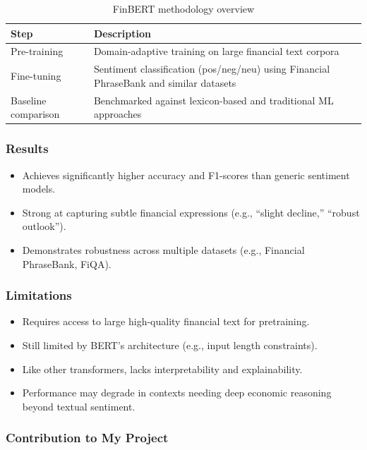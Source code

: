 \documentclass[12pt,a4paper]{report}
\begin{document}
\begin{table}[h]
\centering
\caption{FinBERT methodology overview}
\begin{tabular}{|p{3.5cm}|p{9cm}|}
\hline
\textbf{Step} & \textbf{Description} \\
\hline
Pre-training & Domain-adaptive training on large financial text corpora \\
\hline
Fine-tuning & Sentiment classification (pos/neg/neu) using Financial PhraseBank and similar datasets \\
\hline
Baseline comparison & Benchmarked against lexicon-based and traditional ML approaches \\
\hline
\end{tabular}
\end{table}

\subsubsection{Results}
\begin{itemize}
    \item Achieves significantly higher accuracy and F1-scores than generic sentiment models.  
    \item Strong at capturing subtle financial expressions (e.g., “slight decline,” “robust outlook”).  
    \item Demonstrates robustness across multiple datasets (e.g., Financial PhraseBank, FiQA).  
\end{itemize}

\subsubsection{Limitations}
\begin{itemize}
    \item Requires access to large high-quality financial text for pretraining.  
    \item Still limited by BERT’s architecture (e.g., input length constraints).  
    \item Like other transformers, lacks interpretability and explainability.  
    \item Performance may degrade in contexts needing deep economic reasoning beyond textual sentiment.  
\end{itemize}

\subsubsection{Contribution to My Project}
\end{document}

